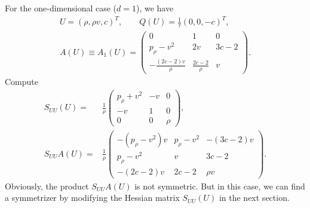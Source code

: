 \documentclass{article}
\theoremstyle{plain}
\begin{document}
For the one-dimensional case ($d=1$), we have
\begin{eqnarray}\label{24}
U=(\rho, \rho v, c)^T, \qquad Q(U) = \frac{1}{\tau}(0, 0, -c)^T, \nonumber\\
A(U) \equiv A_1(U) = \left( \begin{array}{ccc}
	0 & 1 & 0 \\[2mm]
	p_\rho-v^2 & 2v & 3c-2 \\[2mm]
	-\frac{(2c-2)v}{\rho} & \frac{2c-2}{\rho} & v
	\end{array} \right).
\end{eqnarray}
Compute
\begin{eqnarray*}
  S_{UU}(U) = & \frac{1}{\rho} \left( \begin{array}{ccc} p_{\rho} + v^2 & -v & 0\\[2mm]
    -v & 1 & 0 \\[2mm]
      0 & 0 & \rho \end{array} \right) , \\[4mm]
    S_{UU} A(U) = & \frac{1}{\rho} \left( \begin{array}{ccc} -(p_\rho-v^2)v & p_\rho-v^2 & -(3c-2)v \\[2mm]
      p_\rho-v^2 & v  & 3c-2 \\[2mm]
      -(2c-2)v & 2c-2 & \rho v \end{array} \right).
\end{eqnarray*}
Obviously, the product $S_{UU} A(U)$ is not symmetric.
But in this case, we can find a symmetrizer by modifying the Hessian matrix $S_{UU}(U)$ in the next section.
\end{document}

